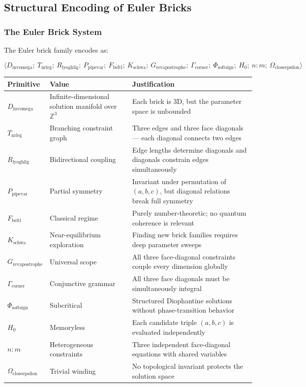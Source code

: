 \documentclass[12pt,a4paper]{article}
\begin{document}
\subsection{Structural Encoding of Euler Bricks}

\subsubsection{The Euler Brick System}

The Euler brick family encodes as:

\[\langle D_{\text{invomega}};\ T_{\text{nrleg}};\ R_{\text{lyoghlig}};\ P_{\text{pipevar}};\ F_{\text{beltl}};\ K_{\text{schwa}};\ G_{\text{revapostrophe}};\ \Gamma_{\text{corner}};\ \Phi_{\text{softsign}};\ H_0;\ n{:}m;\ \Omega_{\text{closeepsilon}} \rangle\]

\begin{table}[htbp]
\centering
\small
{}
\begin{tabularx}{\textwidth}{>{\centering\arraybackslash}X >{\centering\arraybackslash}X >{\centering\arraybackslash}X}
\toprule
\rowcolor{gray!25}\textbf{Primitive} & \textbf{Value} & \textbf{Justification} \\
\midrule
\rowcolors{1}{white}{gray!10}
$D_{\text{invomega}}$ & Infinite-dimensional solution manifold over $\mathbb{Z}^3$ & Each brick is 3D, but the parameter space is unbounded \\
$T_{\text{nrleg}}$ & Branching constraint graph & Three edges and three face diagonals --- each diagonal connects two edges \\
$R_{\text{lyoghlig}}$ & Bidirectional coupling & Edge lengths determine diagonals and diagonals constrain edges simultaneously \\
$P_{\text{pipevar}}$ & Partial symmetry & Invariant under permutation of $(a,b,c)$, but diagonal relations break full symmetry \\
$F_{\text{beltl}}$ & Classical regime & Purely number-theoretic; no quantum coherence is relevant \\
$K_{\text{schwa}}$ & Near-equilibrium exploration & Finding new brick families requires deep parameter sweeps \\
$G_{\text{revapostrophe}}$ & Universal scope & All three face-diagonal constraints couple every dimension globally \\
$\Gamma_{\text{corner}}$ & Conjunctive grammar & All three face diagonals must be simultaneously integral \\
$\Phi_{\text{softsign}}$ & Subcritical & Structured Diophantine solutions without phase-transition behavior \\
$H_0$ & Memoryless & Each candidate triple $(a,b,c)$ is evaluated independently \\
$n{:}m$ & Heterogeneous constraints & Three independent face-diagonal equations with shared variables \\
$\Omega_{\text{closeepsilon}}$ & Trivial winding & No topological invariant protects the solution space \\
\bottomrule
\end{tabularx}
\end{table}
\end{document}
